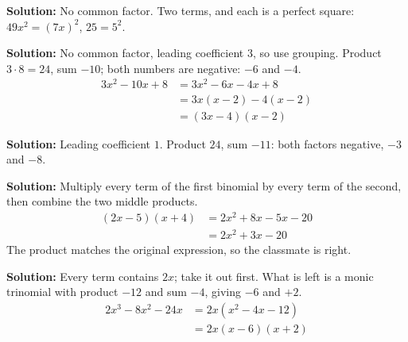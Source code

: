 \documentclass[12pt]{article}
\begin{document}

\textbf{Solution:} No common factor. Two terms, and each is a perfect square: $49x^2 = (7x)^2$, $25 = 5^2$. 


\textbf{Solution:} No common factor, leading coefficient $3$, so use grouping. Product $3 \cdot 8 = 24$, sum $-10$; both numbers are negative: $-6$ and $-4$.
\begin{align*}
  3x^2 - 10x + 8 &= 3x^2 - 6x - 4x + 8 \\
                 &= 3x(x-2) - 4(x-2) \\
                 &= (3x-4)(x-2)
\end{align*}


\textbf{Solution:} Leading coefficient $1$. Product $24$, sum $-11$: both factors negative, $-3$ and $-8$. 


\textbf{Solution:} Multiply every term of the first binomial by every term of the second, then combine the two middle products.
\begin{align*}
  (2x-5)(x+4) &= 2x^2 + 8x - 5x - 20 \\
              &= 2x^2 + 3x - 20
\end{align*}
The product matches the original expression, so the classmate is right. 


\textbf{Solution:} Every term contains $2x$; take it out first. What is left is a monic trinomial with product $-12$ and sum $-4$, giving $-6$ and $+2$.
\begin{align*}
  2x^3 - 8x^2 - 24x &= 2x(x^2 - 4x - 12) \\
                    &= 2x(x-6)(x+2)
\end{align*}

\end{document}
